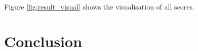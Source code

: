 \documentclass[a4paper]{article}
\begin{document}
Figure \ref{fig:result_visual} shows the visualisation of all scores.

\section{Conclusion}


\printbibliography
\end{document}
